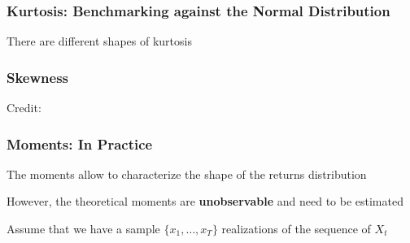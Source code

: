 \documentclass{beamer}
\newenvironment{wideitemize}{\itemize\addtolength{\itemsep}{10pt}}{\enditemize}
\begin{document}
\begin{frame}
  \frametitle{Kurtosis: Benchmarking against the Normal Distribution}
  There are different shapes of kurtosis 

\end{frame}

\begin{frame}
  \frametitle{Skewness}
  \hspace*{15pt}\hbox{\scriptsize Credit:}
\end{frame}


\begin{frame}
  \frametitle{Moments: In Practice}

  \begin{wideitemize}
    \item The moments allow to characterize the shape of the returns distribution
    \item However, the theoretical moments are \textbf{unobservable} and need to be estimated
    \item Assume that we have a sample $\{x_1, \dots, x_T\}$ realizations of the sequence of $X_t$
  \end{wideitemize}
  
\end{frame}
\end{document}
